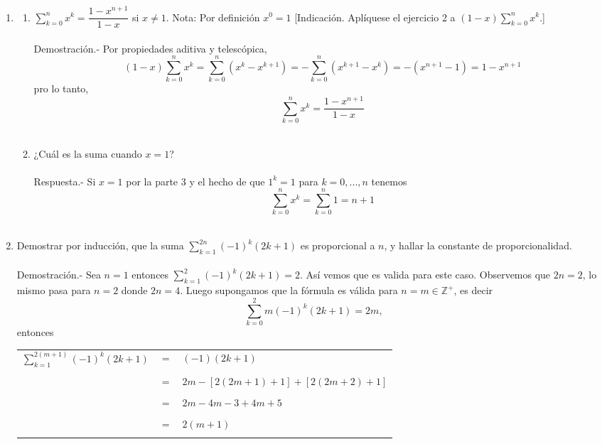 \begin{enumerate}[\bfseries  1.]
\item 
\begin{enumerate}[\bfseries a)]
\item $\displaystyle\sum_{k=0}^n x^k = \dfrac{1 - x^{n+1}}{1-x}$ si $x\neq 1$. Nota: Por definición $x^0 = 1$ [Indicación. Aplíquese el ejercicio 2 a $(1-x) \sum\limits_{k=0}^n x^k.$]\\\\
Demostración.- Por propiedades  aditiva y telescópica, 
$$(1-x) \sum\limits_{k=0}^n x^k =\sum\limits_{k=0}^n (x^k - x^{k+1}) = - \sum\limits_{k=0}^n (x^{k+1} - x^k)=-(x^{n+1}-1) = 1-x^{n+1}$$ 
pro lo tanto, $$\sum\limits_{k=0}^n x^k = \dfrac{1 - x^{n+1}}{1-x}$$\\

\item ¿Cuál es la suma cuando $x=1$?\\\\
Respuesta.- \; 	Si $x=1$ por la parte 3 y el hecho de que $1^k=1$ para $k=0,...,n$ tenemos $$\sum\limits_{k=0}^n x^k = \sum\limits_{k=0}^n 1 = n+1$$\\ 
\end{enumerate}

\item Demostrar por inducción, que la suma $\sum\limits_{k=1}^{2n} (-1)^k (2k+1)$ es proporcional a $n$, y hallar la constante de proporcionalidad.\\\\
Demostración.- \; Sea $n=1$ entonces $\sum\limits_{k=1}^2 (-1)^k (2k+1) = 2$. Así vemos que es valida para este caso. Observemos que  $2n=2$, lo mismo pasa para $n=2$ donde $2n=4.$
Luego supongamos que la fórmula es válida para $n=m \in \mathbb{Z}^+$, es decir $$\sum\limits_{k=0}^2m (-1)^k (2k+1) = 2m,$$ entonces
\begin{center}
\begin{tabular}{r c l}
$\sum\limits_{k=1}^{2(m+1)} (-1)^k(2k+1)$&$=$&$(-1)(2k+1)$\\\\
&$=$&$2m-[2(2m+1)+1] + [2(2m+2)+1]$\\\\
&$=$&$2m-4m-3+4m+5$\\\\
&$=$&$2(m+1)$\\\\
\end{tabular}
\end{center}


\end{enumerate}
